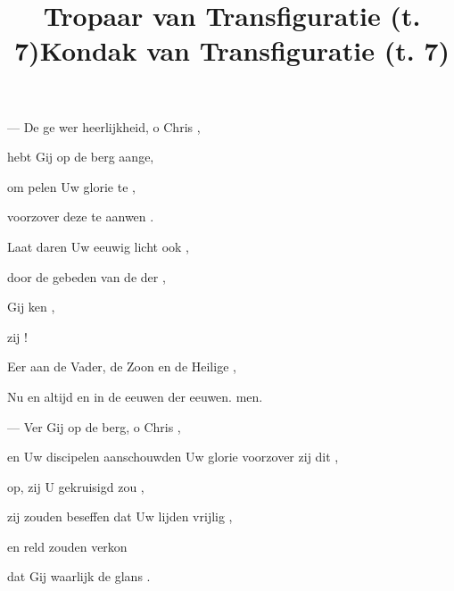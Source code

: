 
\title{Tropaar van Transfiguratie (t. 7)}
--- De ge wer heerlijkheid, o Chris ,\par
hebt Gij op de berg aange,\par
om  pelen Uw glorie te ,\par
voorzover deze te aanwen .\par
Laat   daren Uw eeuwig licht ook ,\par
door de gebeden van de der ,\par
Gij ken ,\par
\finalskip
{} zij ! \fall{---}

\vskip 10pt
Eer aan de Vader, de Zoon en de Heilige ,\par
Nu en altijd en in de eeuwen der eeuwen. men. \par
\vskip 10pt

\title{Kondak van Transfiguratie (t. 7)}
--- Ver  Gij op de berg, o Chris ,\par
en Uw discipelen aanschouwden Uw glorie voorzover zij dit ,\par
op,  zij U gekruisigd zou ,\par
zij zouden beseffen dat Uw lijden vrijlig ,\par
en   reld zouden verkon\par
\finalskip
dat Gij waarlijk  de glans    . \fall{---}

\bye
